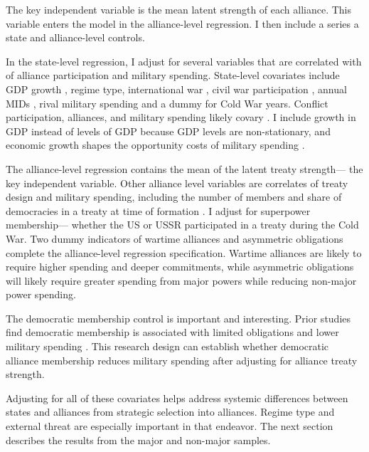 \documentclass[12pt]{article}
\begin{document}
The key independent variable is the mean latent strength of each alliance. 
This variable enters the model in the alliance-level regression. 
I then include a series a state and alliance-level controls. 


In the state-level regression, I adjust for several variables that are correlated with of alliance participation and military spending. 
State-level covariates include GDP growth \citep{Boltetal2018}, regime type, international war \citep{Reiteretal2016}, civil war participation \citep{SarkeesWayman2010}, annual MIDs \citep{Gibleretal2016}, rival military spending \citep{ThompsonDreyer2012} and a dummy for Cold War years.
Conflict participation, alliances, and military spending likely covary \citep{SeneseVasquez2008}. 
I include growth in GDP instead of levels of GDP because GDP levels are non-stationary, and economic growth shapes the opportunity costs of military spending \citep{Kimball2010, Zielinskietal2017}.


The alliance-level regression contains the mean of the latent treaty strength--- the key independent variable. 
Other alliance level variables are correlates of treaty design and military spending, including the number of members and share of democracies in a treaty at time of formation \citep{Chibaetal2015}.
I adjust for superpower membership--- whether the US or USSR participated in a treaty during the Cold War. 
Two dummy indicators of wartime alliances and asymmetric obligations \citep{Leedsetal2002} complete the alliance-level regression specification. 
Wartime alliances are likely to require higher spending and deeper commitments, while asymmetric obligations will likely require greater spending from major powers while reducing non-major power spending. 


The democratic membership control is important and interesting. 
Prior studies find democratic membership is associated with limited obligations \citep{Chibaetal2015} and lower military spending \citep{DigiuseppePoast2016}.
This research design can establish whether democratic alliance membership reduces military spending after adjusting for alliance treaty strength. 


Adjusting for all of these covariates helps address systemic differences between states and alliances from strategic selection into alliances. 
Regime type and external threat are especially important in that endeavor. 
The next section describes the results from the major and non-major samples.
 
\end{document}
